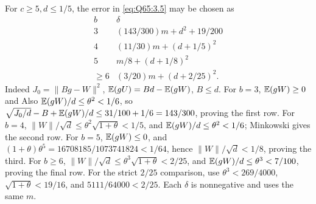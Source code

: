 For \(c\ge\allowbreak 5,\allowbreak d\le\allowbreak 1/5\), the error in \eqref{eq:Q65:3.5} may be chosen as
\begin{equation}\tag{Q65.4.3}\label{eq:Q65:4.3}
\begin{array}{c|c}
b&\delta\\\hline
3&(143/300)m+d^2+19/200\\
4&(11/30)m+(d+1/5)^2\\
5&m/8+(d+1/8)^2\\
\ge6&(3/20)m+(d+2/25)^2.
\end{array}
\end{equation}
Indeed \(J_0=\allowbreak \|Bg-W\|^2\), \(\mathbb E(gU)=\allowbreak Bd-\mathbb E(gW)\), \(B\le\allowbreak  d\).
For \(b=\allowbreak 3\), \(\mathbb E(gW)\ge\allowbreak 0\) and
Also \(\mathbb E(gW)/d\le\allowbreak \theta^2<\allowbreak 1/6\), so
\(\sqrt{J_0/d}-B+\mathbb E(gW)/d\le\allowbreak 31/100+1/6=\allowbreak 143/300\), proving
the first row. For \(b=\allowbreak 4\),
\(\|W\|/\sqrt d\le\allowbreak \theta^2\sqrt{1+\theta}<\allowbreak 1/5\), and
\(\mathbb E(gW)/d\le\allowbreak \theta^2<\allowbreak 1/6\); Minkowski gives the second row.
For \(b=\allowbreak 5\), \(\mathbb E(gW)\le\allowbreak 0\), and
\((1+\theta)\theta^5=\allowbreak 16708185/1073741824<\allowbreak 1/64\), hence
\(\|W\|/\sqrt d<\allowbreak 1/8\), proving the third.
For \(b\ge\allowbreak 6\), \(\|W\|/\sqrt d\le\allowbreak \theta^3\sqrt{1+\theta}<\allowbreak 2/25\),
and \(\mathbb E(gW)/d\le\allowbreak \theta^3<\allowbreak 7/100\), proving the final row.
For the strict \(2/25\) comparison, use
\(\theta^3<\allowbreak 269/4000\), \(\sqrt{1+\theta}<\allowbreak 19/16\), and
\(5111/64000<\allowbreak 2/25\). Each \(\delta\) is nonnegative and uses the same \(m\).

